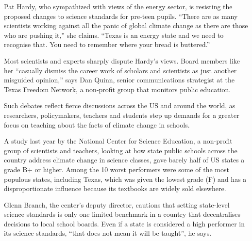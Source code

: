 
Pat Hardy, who sympathized with views of the energy sector, is resisting the proposed changes to science standards for pre-teen pupils. ``There are as many scientists working against all the panic of global climate change as there are those who are pushing it,'' she claims. ``Texas is an energy state and we need to recognise that. You need to remember where your bread is buttered.''


Most scientists and experts sharply dispute Hardy's views. Board members like her “casually dismiss the career work of scholars and scientists as just another misguided opinion,” says Dan Quinn, senior communications strategist at the Texas Freedom Network, a non-profit group that monitors public education.

Such debates reflect fierce discussions across the US and around the world, as researchers, policymakers, teachers and students step up demands for a greater focus on teaching about the facts of climate change in schools.

A study last year by the National Center for Science Education, a non-profit group of scientists and teachers, looking at how state public schools across the country address climate change in science classes, gave barely half of US states a grade B+ or higher. Among the 10 worst performers were some of the most populous states, including Texas, which was given the lowest grade (F) and has a disproportionate influence because its textbooks are widely sold elsewhere.

Glenn Branch, the center's deputy director, cautions that setting state-level science standards is only one limited benchmark in a country that decentralises decisions to local school boards. Even if a state is considered a high performer in its science standards, ``that does not mean it will be taught'', he says.

